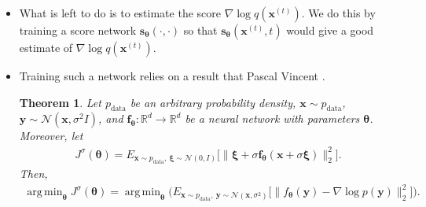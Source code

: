 \documentclass[10pt]{article}
\newtheorem{theorem}[lemma]{Theorem}
\newcommand{\ve}[1]{\mathbf{#1}}
\newcommand{\mrm}[1]{\mathrm{#1}}
\newcommand{\ves}[1]{\boldsymbol{#1}}
\newcommand{\mcal}[1]{\mathcal{#1}}
\newcommand{\Real}{\mathbb{R}}
\DeclareMathOperator*{\argmin}{arg\,min}
\begin{document}
\begin{itemize}
  \item What is left to do is to estimate the score $\nabla \log q(\ve{x}^{(t)})$. We do this by training a score network $\ve{s}_{\ves{\theta}}(\cdot, \cdot)$ so that $\ve{s}_{\ves{\theta}}(\ve{x}^{(t)},t)$ would give a good estimate of $\nabla \log q(\ve{x}^{(t)})$.

  \item Training such a network relies on a result that Pascal Vincent \cite{Vincent:2011}.
  
  \begin{theorem} \label{score-matching-optimization}
    Let $p_{\mrm{data}}$ be an arbitrary probability density, $\ve{x} \sim p_{\mrm{data}}$, $\ve{y} \sim \mcal{N}(\ve{x}, \sigma^2 I)$, and $\ve{f}_{\ves{\theta}}: \Real^d \rightarrow \Real^d$ be a neural network with parameters $\ves{\theta}$. Moreover, let
    \begin{align*}
      J^\sigma(\ves{\theta}) 
      = E_{\ve{x} \sim p_{\mrm{data}},\ \ves{\xi} \sim \mcal{N}(0,I)} \Big[ \| \ves{\xi} + \sigma \ve{f}_{\ves{\theta}}(\ve{x} + \sigma \ves{\xi}) \|^2_2 \Big].
  \end{align*}
  Then, 
  \begin{align*}
      \argmin_{\ves{\theta}} J^\sigma(\ves{\theta}) = 
      \argmin_{\ves{\theta}} \bigg( E_{\ve{x} \sim p_{\mrm{data}},\ \ve{y} \sim \mcal{N}(\ve{x}, \sigma^2)} \Big[ \big\| f_{\ves{\theta}}(\ve{y}) - \nabla \log p(\ve{y}) \big\|_2^2 \Big] \bigg).
  \end{align*}        
  \end{theorem}


\end{itemize}
\end{document}
